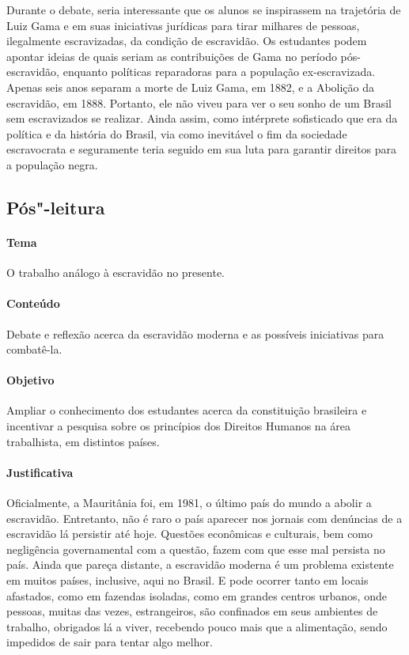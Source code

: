 \documentclass[12pt]{extarticle}
\begin{document}
Durante o debate, seria interessante que os alunos se inspirassem
na trajetória de Luiz Gama e em suas iniciativas jurídicas 
para tirar milhares de pessoas, ilegalmente escravizadas, da 
condição de escravidão. Os estudantes podem apontar ideias 
de quais seriam as contribuições de Gama no período pós-escravidão,
enquanto políticas reparadoras para a população ex-escravizada. 
Apenas seis anos separam a morte de Luiz Gama, em 1882, e a Abolição da escravidão, em 1888. 
Portanto, ele não viveu para ver o seu sonho de um Brasil sem escravizados se realizar.
Ainda assim, como intérprete sofisticado que era da política e da história do Brasil, via
como inevitável o fim da sociedade escravocrata e seguramente teria seguido em sua 
luta para garantir direitos para a população negra.

\subsection{Pós"-leitura}

\paragraph{Tema} O trabalho análogo à escravidão no presente.

\paragraph{Conteúdo} Debate e reflexão acerca da escravidão
moderna e as possíveis iniciativas para combatê-la.

\paragraph{Objetivo} Ampliar o conhecimento dos estudantes
acerca da constituição brasileira e incentivar a pesquisa
sobre os princípios dos Direitos Humanos na área trabalhista, em distintos países.

\paragraph{Justificativa} Oficialmente, a Mauritânia foi, em 1981, o último país do
mundo a abolir a escravidão. Entretanto, não é raro o país aparecer nos
jornais com denúncias de a escravidão lá persistir até hoje. Questões
econômicas e culturais, bem como negligência governamental com a
questão, fazem com que esse mal persista no país. Ainda que pareça
distante, a escravidão moderna é um problema existente em muitos países,
inclusive, aqui no Brasil. E pode ocorrer tanto em locais afastados,
como em fazendas isoladas, como em grandes centros urbanos, onde
pessoas, muitas das vezes, estrangeiros, são confinados em seus
ambientes de trabalho, obrigados lá a viver, recebendo pouco mais que a
alimentação, sendo impedidos de sair para tentar algo melhor. 
\end{document}
